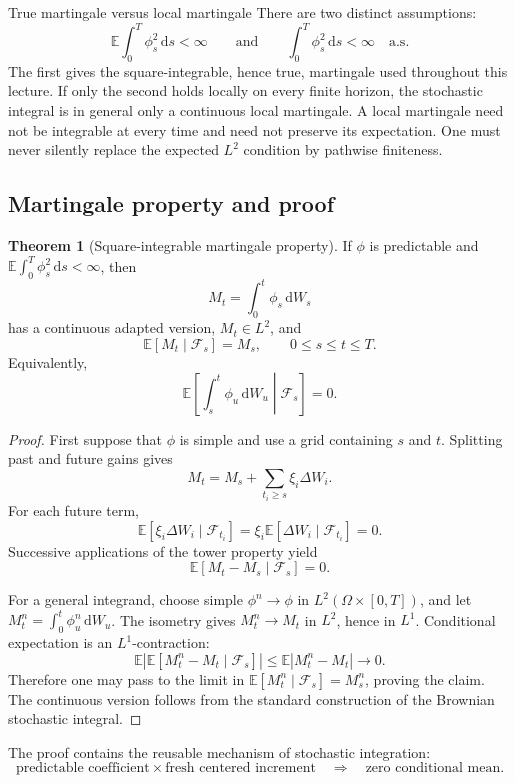 \documentclass[10pt]{article}
\newcommand{\E}{\mathbb E}
\newcommand{\1}{\mathbf 1}
\newcommand{\cF}{\mathcal F}
\newcommand{\dd}{\,\mathrm d}
\theoremstyle{definition}
\newtheorem{theorem}[definition]{Theorem}
\begin{document}
\begin{warningbox}{True martingale versus local martingale}
There are two distinct assumptions:
\[
\boxed{\E\int_0^T\phi_s^2\dd s<\infty}
\qquad\text{and}\qquad
\boxed{\int_0^T\phi_s^2\dd s<\infty\quad\text{a.s.}}
\]
The first gives the square-integrable, hence true, martingale used throughout
this lecture. If only the second holds locally on every finite horizon, the
stochastic integral is in general only a continuous local martingale. A local
martingale need not be integrable at every time and need not preserve its
expectation. One must never silently replace the expected \(L^2\) condition by
pathwise finiteness.
\end{warningbox}

\subsection{Martingale property and proof}

\begin{theorem}[Square-integrable martingale property]
If \(\phi\) is predictable and
\(\E\int_0^T\phi_s^2\dd s<\infty\), then
\[
M_t=\int_0^t\phi_s\dd W_s
\]
has a continuous adapted version, \(M_t\in L^2\), and
\[
\boxed{\E[M_t\mid\cF_s]=M_s,
\qquad 0\leq s\leq t\leq T.}
\]
Equivalently,
\[
\E\left[\int_s^t\phi_u\dd W_u\middle|\cF_s\right]=0.
\]
\end{theorem}

\begin{proof}
First suppose that \(\phi\) is simple and use a grid containing \(s\) and
\(t\). Splitting past and future gains gives
\[
M_t=M_s+\sum_{t_i\geq s}\xi_i\Delta W_i.
\]
For each future term,
\[
\E[\xi_i\Delta W_i\mid\cF_{t_i}]
=\xi_i\E[\Delta W_i\mid\cF_{t_i}]=0.
\]
Successive applications of the tower property yield
\[
\E[M_t-M_s\mid\cF_s]=0.
\]

For a general integrand, choose simple \(\phi^n\to\phi\) in
\(L^2(\Omega\times[0,T])\), and let
\(M_t^n=\int_0^t\phi_u^n\dd W_u\). The isometry gives
\(M_t^n\to M_t\) in \(L^2\), hence in \(L^1\). Conditional expectation is an
\(L^1\)-contraction:
\[
\E\left|
\E[M_t^n-M_t\mid\cF_s]
\right|
\leq\E|M_t^n-M_t|\longrightarrow0.
\]
Therefore one may pass to the limit in
\(\E[M_t^n\mid\cF_s]=M_s^n\), proving the claim. The continuous version follows
from the standard construction of the Brownian stochastic integral.
\end{proof}

The proof contains the reusable mechanism of stochastic integration:
\[
\text{predictable coefficient}\times
\text{fresh centered increment}
\quad\Longrightarrow\quad
\text{zero conditional mean}.
\]
\end{document}
